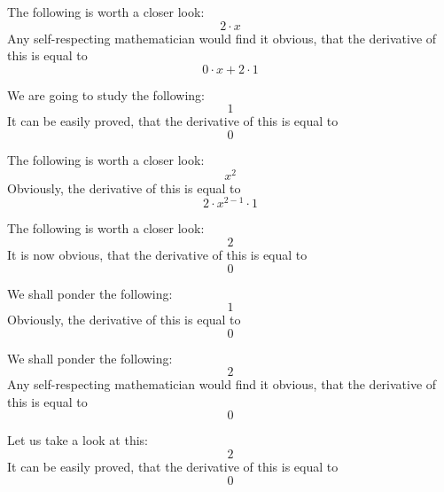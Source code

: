 \documentclass{article}
\begin{document}
The following is worth a closer look:
\begin{equation}
2 \cdot x 
\end{equation}
Any self-respecting mathematician would find it obvious, that the derivative of this is equal to
\begin{equation}
0 \cdot x + 2 \cdot 1 
\end{equation}

We are going to study the following:
\begin{equation}
1 
\end{equation}
It can be easily proved, that the derivative of this is equal to
\begin{equation}
0 
\end{equation}

The following is worth a closer look:
\begin{equation}
x ^{2 } 
\end{equation}
Obviously, the derivative of this is equal to
\begin{equation}
2 \cdot x ^{2 - 1 } \cdot 1 
\end{equation}

The following is worth a closer look:
\begin{equation}
2 
\end{equation}
It is now obvious, that the derivative of this is equal to
\begin{equation}
0 
\end{equation}

We shall ponder the following:
\begin{equation}
1 
\end{equation}
Obviously, the derivative of this is equal to
\begin{equation}
0 
\end{equation}

We shall ponder the following:
\begin{equation}
2 
\end{equation}
Any self-respecting mathematician would find it obvious, that the derivative of this is equal to
\begin{equation}
0 
\end{equation}

Let us take a look at this:
\begin{equation}
2 
\end{equation}
It can be easily proved, that the derivative of this is equal to
\begin{equation}
0 
\end{equation}
\end{document}
